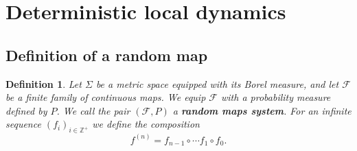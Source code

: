\documentclass[pdftex,11pt,a4paper,oneside]{article}
\theoremstyle{plain}
\newtheorem{definition}{Definition}[section]
\begin{document}

\section{Deterministic local dynamics}
\subsection{Definition of a random map}
\begin{definition}
Let $\Sigma$ be a metric space equipped with its Borel measure, and let $\mathcal{F}$ be a finite family of continuous maps. We equip $\mathcal{F}$ with a probability measure defined by $P$. We call the pair $(\mathcal{F},P)$ a \textbf{random maps system}. For an infinite sequence $(f_i)_{i\in\mathbb{Z}^+}$ we define the composition 
\[f^{(n)}= f_{n-1}\circ\cdots f_{1}\circ f_0.\]
\end{definition}
\end{document}
